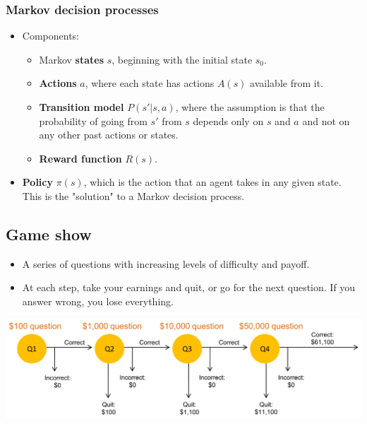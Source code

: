 \documentclass[11pt]{article}
\begin{document}
\subsubsection{Markov decision processes}
\label{sec:org3add3c9}
\begin{itemize}
\item Components:
\begin{itemize}
\item Markov \textbf{states} \(s\), beginning with the initial state \(s_0\).
\item \textbf{Actions} \(a\), where each state has actions \(A(s)\) available from it.
\item \textbf{Transition model} \(P (s' | s, a)\), where the assumption is that the probability of going from \(s'\) from \(s\) depends only on \(s\) and \(a\) and not on any other past actions or states.
\item \textbf{Reward function} \(R(s)\).
\end{itemize}
\item \textbf{Policy} \(\pi (s)\), which is the action that an agent takes in any given state. This is the "solution" to a Markov decision process.
\end{itemize}

 \newpage
\subsection{Game show}
\label{sec:org6484961}
\begin{itemize}
\item A series of questions with increasing levels of difficulty and payoff.
\item At each step, take your earnings and quit, or go for the next question. If you answer wrong, you lose everything.
\end{itemize}

\begin{center}
\includegraphics[width=.9\linewidth]{./images/game-show-flow-chart.png}
\end{center}
\end{document}
